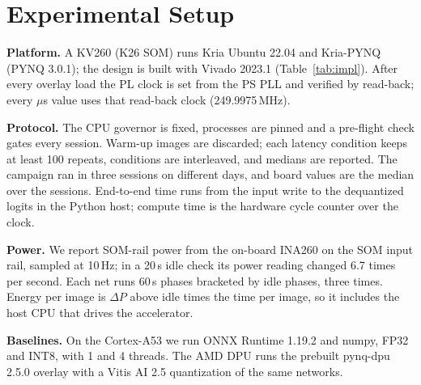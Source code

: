 \section{Experimental Setup}\label{sec:setup}


\textbf{Platform.} A KV260 (K26 SOM) runs Kria Ubuntu 22.04 and Kria-PYNQ (PYNQ 3.0.1);
the design is built with Vivado 2023.1 (Table~\ref{tab:impl}). After every
overlay load the PL clock is set from the PS PLL and verified by read-back;
every $\mu$s value uses that read-back clock (249.9975\,MHz).

\textbf{Protocol.} The CPU governor is fixed, processes are pinned and a
pre-flight check gates every session. Warm-up images are discarded; each
latency condition keeps at least 100 repeats, conditions are interleaved,
and medians are reported. The campaign ran in three sessions on different
days, and board values are the median over the sessions.
End-to-end time runs from the input write to the dequantized logits in the
Python host; compute time is the hardware cycle counter over the clock.

\textbf{Power.} We report SOM-rail power from the on-board INA260 on the SOM input rail,
sampled at 10\,Hz; in a 20\,s idle check its power reading changed 6.7 times
per second. Each net runs
60\,s phases bracketed by idle phases, three times. Energy per image is
$\Delta P$ above idle times the time per image, so it includes the host
CPU that drives the accelerator. %

\textbf{Baselines.} On the Cortex-A53 we run ONNX Runtime 1.19.2 and numpy,
FP32 and INT8, with 1 and 4 threads. The AMD DPU runs the prebuilt pynq-dpu
2.5.0 overlay with a Vitis AI 2.5 quantization of the same networks.
